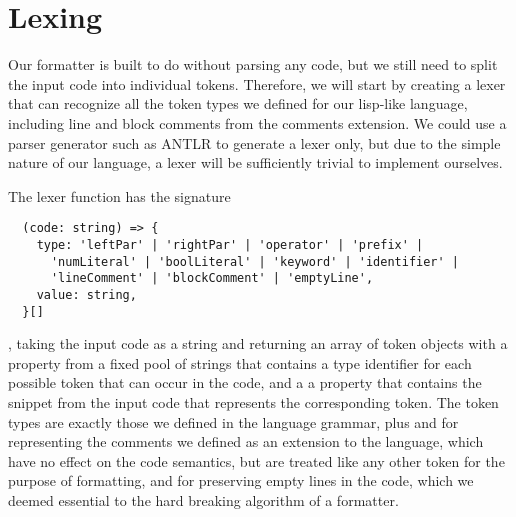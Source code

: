 \section{Lexing}
Our formatter is built to do without parsing any code,
but we still need to split the input code into individual tokens.
Therefore, we will start by creating a lexer that can recognize
all the token types we defined for our lisp-like language,
including line and block comments from the comments extension.
We could use a parser generator such as ANTLR to generate a lexer only,
but due to the simple nature of our language,
a lexer will be sufficiently trivial to implement ourselves.

The lexer function has the signature
\begin{verbatim}
  (code: string) => {
    type: 'leftPar' | 'rightPar' | 'operator' | 'prefix' |
      'numLiteral' | 'boolLiteral' | 'keyword' | 'identifier' |
      'lineComment' | 'blockComment' | 'emptyLine',
    value: string,
  }[]
\end{verbatim}
, taking the input code as a string and returning an array of
token objects with a property  from a fixed pool of
strings that contains a type identifier
for each possible token that can occur in the code,
and a a property  that contains the
snippet from the input code that represents the corresponding token.
The token types are exactly those we defined in the language grammar,
plus  and 
for representing the comments we defined as an extension to the language,
which have no effect on the code semantics,
but are treated like any other token for the purpose of formatting,
and  for preserving empty lines in the code,
which we deemed essential to the hard breaking algorithm of a formatter.


















